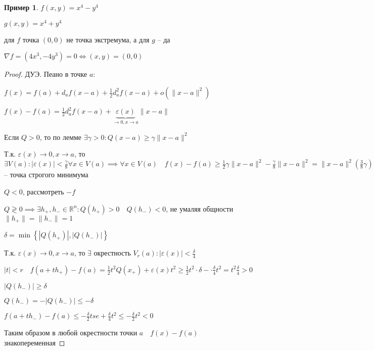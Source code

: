 \documentclass{book}
\newcommand\R{\ensuremath{\mathbb{R}}}
\theoremstyle{definition}
\newtheorem*{example}{Пример}
\begin{document}
        \begin{example}
            $f(x, y) = x^4 - y^4$

            $g(x, y) = x^4 + y^4$

            для $f$ точка $(0, 0)$ не точка экстремума, а для $g$ -- да 

            $\nabla f = \left( 4x^3, -4y^3 \right)  = 0 \iff  \left( x,y \right)  = \left( 0, 0 \right) $
        \end{example}

        \begin{proof}
            ДУЭ. Пеано в точке $a$:

            $f(x) = f(a) + d_af(x-a) + \frac{1}{2} d^2_af(x-a) + o\left( \|x-a\|^2 \right) $ 

            $f(x) - f(a) = \frac{1}{2} d^2_af(x-a) + \underbrace{\varepsilon(x)}_{\to 0, x\to a}\|x-a\| $

            Если $Q>0$, то по лемме $\exists \gamma >0: Q(x-a) \geqslant  \gamma \|x-a\|^2$

            Т.к. $\varepsilon(x) \to 0, x\to a$, то $\exists V(a): \left| \varepsilon(x) \right| <\frac{\gamma}{8} \forall x\in V(a) \implies  \forall x\in V(a)\quad f(x) - f(a) \geqslant \frac{1}{2} \gamma \|x-a\|^2 - \frac{\gamma}{8} \|x-a\|^2 = \|x-a\|^2\left( \frac{3}{8}\gamma \right) >0\quad x\neq a \implies a$ -- точка строгого минимума

            $Q<0$, рассмотреть  $-f$

            $Q\gtrless 0 \implies  \exists h_+, h_- \in \R^n: Q\left( h_+ \right) >0\quad Q\left( h_- \right) <0$, не умаляя общности $\|h_+\| = \|h_-\| = 1$ 

            $\delta = \min \left\{ \left| Q\left( h_+ \right)  \right| , \left| Q\left( h_- \right)  \right|  \right\} $ 

            Т.к. $\varepsilon(x)\to 0, x\to a$, то $\exists $ окрестность $V_r(a): \left| \varepsilon(x) \right| <\frac{\delta}{4}$ 

            $|t|<r\quad f\left( a + th_+ \right)  - f(a) = \frac{1}{2} t^2 Q\left( x_+ \right) + \varepsilon(x)t^2 \geqslant  \frac{1}{2} t^2\cdot \delta - \cdot \frac{\delta}{4}t^2= t^2 \frac{\delta}{4}>0$ 

            $\left| Q(h_-) \right| \geqslant \delta$

            $Q(h_-) = - |Q(h_-)| \leqslant -\delta$

            $f\left( a + th_- \right) - f(a) \leqslant - \frac{\delta}{2}tse + \frac{\delta}{4}t^2 \leqslant -\frac{\delta}{2}t^2<0 $

            Таким образом в любой окрестности точки $a\quad f(x) - f(a)$ знакопеременная

        \end{proof}
\end{document}
